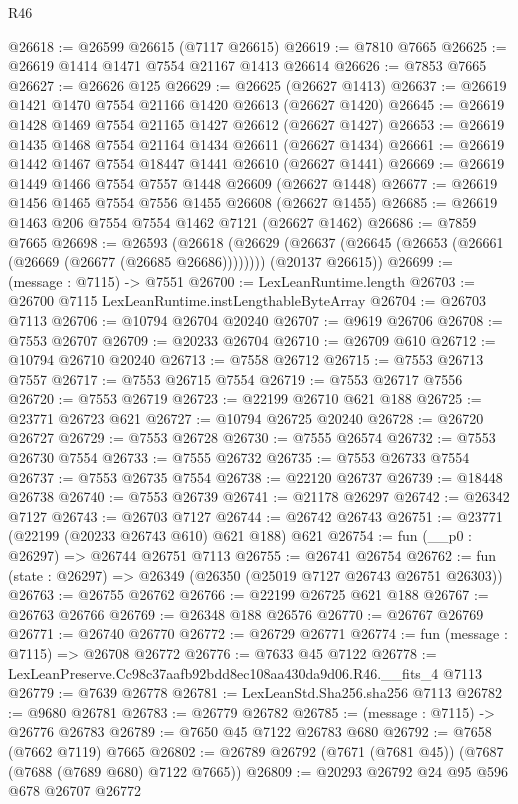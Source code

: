 \begin{lexlean}{R46}
\begin{coremodule}
@26618 := @26599 @26615 (@7117 @26615)
@26619 := @7810 @7665
@26625 := @26619 @1414 @1471 @7554 @21167 @1413 @26614
@26626 := @7853 @7665
@26627 := @26626 @125
@26629 := @26625 (@26627 @1413)
@26637 := @26619 @1421 @1470 @7554 @21166 @1420 @26613 (@26627 @1420)
@26645 := @26619 @1428 @1469 @7554 @21165 @1427 @26612 (@26627 @1427)
@26653 := @26619 @1435 @1468 @7554 @21164 @1434 @26611 (@26627 @1434)
@26661 := @26619 @1442 @1467 @7554 @18447 @1441 @26610 (@26627 @1441)
@26669 := @26619 @1449 @1466 @7554 @7557 @1448 @26609 (@26627 @1448)
@26677 := @26619 @1456 @1465 @7554 @7556 @1455 @26608 (@26627 @1455)
@26685 := @26619 @1463 @206 @7554 @7554 @1462 @7121 (@26627 @1462)
@26686 := @7859 @7665
@26698 := @26593
    (@26618
      (@26629 (@26637 (@26645 (@26653 (@26661 (@26669 (@26677 (@26685 @26686))))))))
      (@20137 @26615))
@26699 := (message : @7115) -> @7551
@26700 := LexLeanRuntime.length
@26703 := @26700 @7115 LexLeanRuntime.instLengthableByteArray
@26704 := @26703 @7113
@26706 := @10794 @26704 @20240
@26707 := @9619 @26706
@26708 := @7553 @26707
@26709 := @20233 @26704
@26710 := @26709 @610
@26712 := @10794 @26710 @20240
@26713 := @7558 @26712
@26715 := @7553 @26713 @7557
@26717 := @7553 @26715 @7554
@26719 := @7553 @26717 @7556
@26720 := @7553 @26719
@26723 := @22199 @26710 @621 @188
@26725 := @23771 @26723 @621
@26727 := @10794 @26725 @20240
@26728 := @26720 @26727
@26729 := @7553 @26728
@26730 := @7555 @26574
@26732 := @7553 @26730 @7554
@26733 := @7555 @26732
@26735 := @7553 @26733 @7554
@26737 := @7553 @26735 @7554
@26738 := @22120 @26737
@26739 := @18448 @26738
@26740 := @7553 @26739
@26741 := @21178 @26297
@26742 := @26342 @7127
@26743 := @26703 @7127
@26744 := @26742 @26743
@26751 := @23771 (@22199 (@20233 @26743 @610) @621 @188) @621
@26754 := fun (__p0 : @26297) => @26744 @26751 @7113
@26755 := @26741 @26754
@26762 := fun (state : @26297) => @26349 (@26350 (@25019 @7127 @26743 @26751 @26303))
@26763 := @26755 @26762
@26766 := @22199 @26725 @621 @188
@26767 := @26763 @26766
@26769 := @26348 @188 @26576
@26770 := @26767 @26769
@26771 := @26740 @26770
@26772 := @26729 @26771
@26774 := fun (message : @7115) => @26708 @26772
@26776 := @7633 @45 @7122
@26778 := LexLeanPreserve.Cc98c37aafb92bdd8ec108aa430da9d06.R46.__fits_4 @7113
@26779 := @7639 @26778
@26781 := LexLeanStd.Sha256.sha256 @7113
@26782 := @9680 @26781
@26783 := @26779 @26782
@26785 := (message : @7115) -> @26776 @26783
@26789 := @7650 @45 @7122 @26783 @680
@26792 := @7658 (@7662 @7119) @7665
@26802 := @26789 @26792 (@7671 (@7681 @45)) (@7687 (@7688 (@7689 @680) @7122 @7665))
@26809 := @20293 @26792 @24 @95 @596 @678 @26707 @26772

\end{coremodule}
\end{lexlean}
